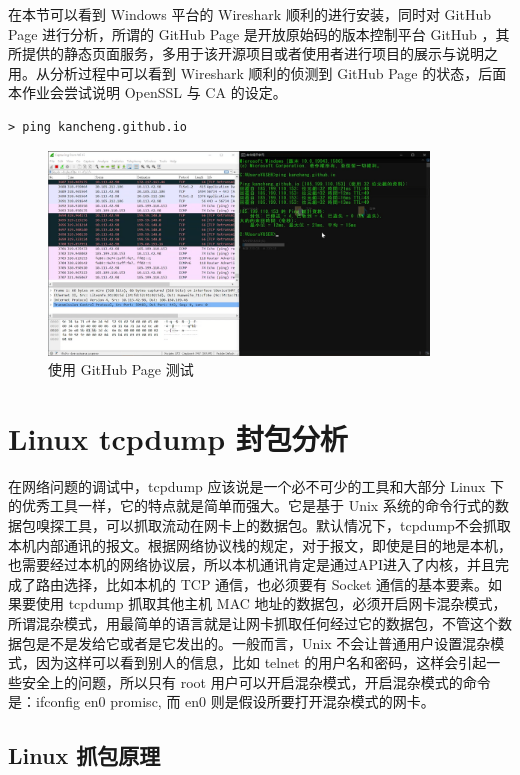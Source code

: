 在本节可以看到 Windows 平台的 Wireshark 顺利的进行安装，同时对 GitHub Page 进行分析，所谓的 GitHub Page 是开放原始码的版本控制平台 GitHub ，其所提供的静态页面服务，多用于该开源项目或者使用者进行项目的展示与说明之用。从分析过程中可以看到 Wireshark 顺利的侦测到 GitHub Page 的状态，后面本作业会尝试说明 OpenSSL 与 CA 的设定。

\begin{Verbatim}
> ping kancheng.github.io
\end{Verbatim}

\begin{figure}[htb]
\centering 
\includegraphics[width=0.90\textwidth]{img/ch1s1m11.png} 
\caption{使用 GitHub Page 测试}
\label{Test}
\end{figure}

\section{Linux tcpdump 封包分析}

在网络问题的调试中，tcpdump 应该说是一个必不可少的工具和大部分 Linux 下的优秀工具一样，它的特点就是简单而强大。它是基于 Unix 系统的命令行式的数据包嗅探工具，可以抓取流动在网卡上的数据包。默认情况下，tcpdump不会抓取本机内部通讯的报文。根据网络协议栈的规定，对于报文，即使是目的地是本机，也需要经过本机的网络协议层，所以本机通讯肯定是通过API进入了内核，并且完成了路由选择，比如本机的 TCP 通信，也必须要有 Socket 通信的基本要素。如果要使用 tcpdump 抓取其他主机 MAC 地址的数据包，必须开启网卡混杂模式，所谓混杂模式，用最简单的语言就是让网卡抓取任何经过它的数据包，不管这个数据包是不是发给它或者是它发出的。一般而言，Unix 不会让普通用户设置混杂模式，因为这样可以看到别人的信息，比如 telnet 的用户名和密码，这样会引起一些安全上的问题，所以只有 root 用户可以开启混杂模式，开启混杂模式的命令是：ifconfig en0 promisc, 而 en0 则是假设所要打开混杂模式的网卡。


\subsection{Linux 抓包原理}

